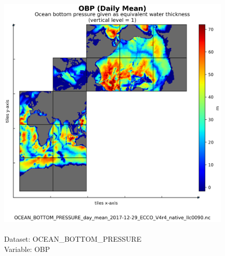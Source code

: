 \begin{figure}[H]
\centering
\includegraphics[scale=0.5]{../images/plots/native_plots/Ocean_Bottom_Pressure/OBP.png}
\caption{\\Dataset: OCEAN\_BOTTOM\_PRESSURE\\Variable: OBP}
\label{tab:table-OCEAN_BOTTOM_PRESSURE_OBP-Plot}
\end{figure}
\pagebreak
